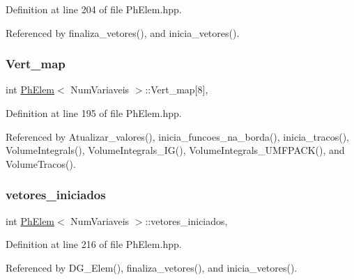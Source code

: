 Definition at line 204 of file Ph\+Elem.\+hpp.



Referenced by finaliza\+\_\+vetores(), and inicia\+\_\+vetores().

\mbox{\label{classPhElem_a07f19f862b13cc9c5f80271b03a5a023}} 
\subsubsection{\texorpdfstring{Vert\+\_\+map}{Vert\_map}}
{\footnotesize\ttfamily int \hyperlink{classPhElem}{Ph\+Elem}$<$ Num\+Variaveis $>$\+::Vert\+\_\+map\mbox{[}8\mbox{]}\hspace{0.3cm}{\ttfamily [protected]}, {\ttfamily [inherited]}}



Definition at line 195 of file Ph\+Elem.\+hpp.



Referenced by Atualizar\+\_\+valores(), inicia\+\_\+funcoes\+\_\+na\+\_\+borda(), inicia\+\_\+tracos(), Volume\+Integrals(), Volume\+Integrals\+\_\+\+I\+G(), Volume\+Integrals\+\_\+\+U\+M\+F\+P\+A\+C\+K(), and Volume\+Tracos().

\mbox{\label{classPhElem_a65f545dc1bf0d90240419934eb711a9d}} 
\subsubsection{\texorpdfstring{vetores\+\_\+iniciados}{vetores\_iniciados}}
{\footnotesize\ttfamily int \hyperlink{classPhElem}{Ph\+Elem}$<$ Num\+Variaveis $>$\+::vetores\+\_\+iniciados\hspace{0.3cm}{\ttfamily [protected]}, {\ttfamily [inherited]}}



Definition at line 216 of file Ph\+Elem.\+hpp.



Referenced by D\+G\+\_\+\+Elem(), finaliza\+\_\+vetores(), and inicia\+\_\+vetores().

\mbox{\label{classDG__Elem_aeb8874934ea534afbee1017456e54051}} 
